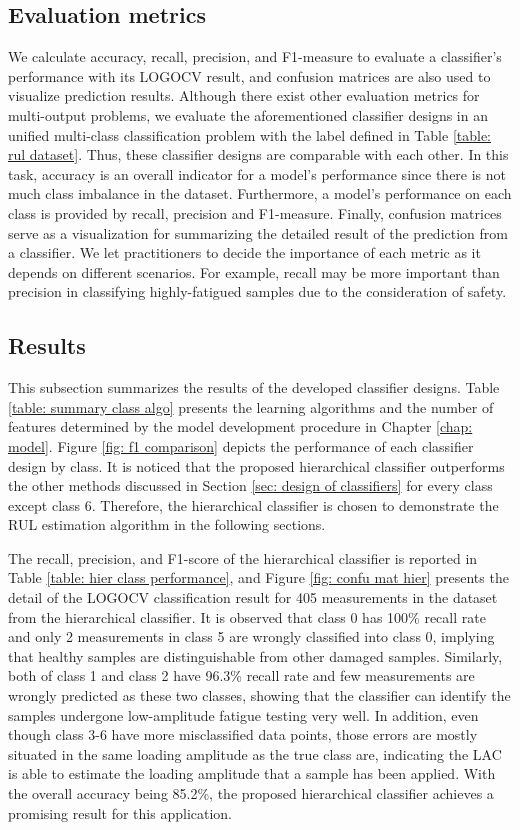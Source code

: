 \subsection{Evaluation metrics}
We calculate accuracy, recall, precision, and F1-measure to evaluate a classifier's performance with its LOGOCV result, and confusion matrices are also used to visualize prediction results. Although there exist other evaluation metrics for multi-output problems, we evaluate the aforementioned classifier designs in an unified multi-class classification problem with the label defined in Table \ref{table: rul dataset}. Thus, these classifier designs are comparable with each other. In this task, accuracy is an overall indicator for a model's performance since there is not much class imbalance in the dataset. Furthermore, a model's performance on each class is provided by recall, precision and F1-measure. Finally, confusion matrices serve as a visualization for summarizing the detailed result of the prediction from a classifier. We let practitioners to decide the importance of each metric as it depends on different scenarios. For example, recall may be more important than precision in classifying highly-fatigued samples due to the consideration of safety.

\subsection{Results}
This subsection summarizes the results of the developed classifier designs. Table \ref{table: summary class algo} presents the learning algorithms and the number of features determined by the model development procedure in Chapter \ref{chap: model}. Figure \ref{fig: f1 comparison} depicts the performance of each classifier design by class. It is noticed that the proposed hierarchical classifier outperforms the other methods discussed in Section \ref{sec: design of classifiers} for every class except class 6. Therefore, the hierarchical classifier is chosen to demonstrate the RUL estimation algorithm in the following sections.

The recall, precision, and F1-score of the hierarchical classifier is reported in Table \ref{table: hier class performance}, and Figure \ref{fig: confu mat hier} presents the detail of the LOGOCV classification result for 405 measurements in the dataset from the hierarchical classifier. It is observed that class 0 has 100\% recall rate and only 2 measurements in class 5 are wrongly classified into class 0, implying that healthy samples are distinguishable from other damaged samples. Similarly, both of class 1 and class 2 have 96.3\% recall rate and few measurements are wrongly predicted as these two classes, showing that the classifier can identify the samples undergone low-amplitude fatigue testing very well. In addition, even though class 3-6 have more misclassified data points, those errors are mostly situated in the same loading amplitude as the true class are, indicating the LAC is able to estimate the loading amplitude that a sample has been applied. With the overall accuracy being 85.2\%, the proposed hierarchical classifier achieves a promising result for this application.

